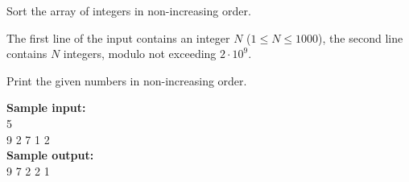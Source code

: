 \documentclass[a4paper]{article}
\begin{document}
Sort the array of integers   in non-increasing order.

The first line of the input contains an integer $N$ ($1 \le N \le 1000$), the second line contains $N$ integers, modulo not exceeding $2 \cdot 10^9$.

Print the given numbers in non-increasing order.

\SPACE

\noindent \textbf{Sample input:}\\
5\\
9 2 7 1 2\\


\noindent \textbf{Sample output:}\\
9 7 2 2 1\\
\end{document}
